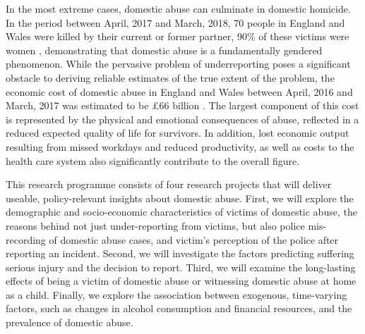 \documentclass[11pt, a4paper]{article}
\begin{document}
In the most extreme cases, domestic abuse can culminate in domestic homicide. In the period between April, 2017 and March, 2018, 70 people in England and Wales were killed by their current or former partner, 90\% of these victims were women \cite{homic}, demonstrating that domestic abuse is a fundamentally gendered phenomenon. While the pervasive problem of underreporting poses a significant obstacle to deriving reliable estimates of the true extent of the problem, the economic cost of domestic abuse in England and Wales between April, 2016 and March, 2017 was estimated to be \pounds 66 billion \cite{costs}. The largest component of this cost is represented by the physical and emotional consequences of abuse, reflected in a reduced expected quality of life for survivors. In addition, lost economic output resulting from missed workdays and reduced productivity, as well as costs to the health care system also significantly contribute to the overall figure. 

This research programme consists of four research projects that will deliver useable, policy-relevant insights about domestic abuse. First, we will explore the demographic and socio-economic characteristics of victims of domestic abuse, the reasons behind not just under-reporting from victims, but also police mis-recording of domestic abuse cases, and victim's perception of the police after reporting an incident. Second, we will investigate the factors predicting suffering serious injury and the decision to report. Third, we will examine the long-lasting effects of being a victim of domestic abuse or witnessing domestic abuse at home as a child. Finally, we explore the association between exogenous, time-varying factors, such as changes in alcohol consumption and financial resources, and the prevalence of domestic abuse. 


\end{document}
